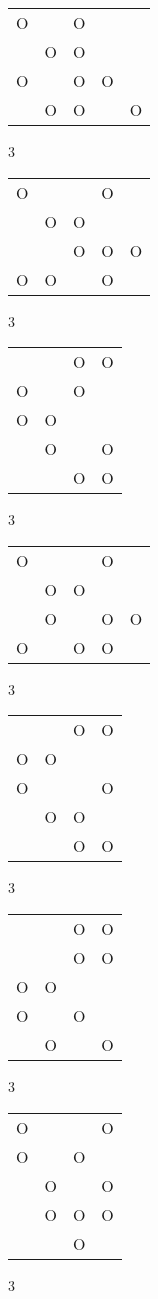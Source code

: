 \begin{tabular}{|m{0.2cm}m{0.2cm}m{0.2cm}m{0.2cm}m{0.2cm}|}\hline
O& &O& & \\
 &O&O& & \\
O& &O&O& \\
 &O&O& &O\\
\hline\end{tabular}3
\begin{tabular}{|m{0.2cm}m{0.2cm}m{0.2cm}m{0.2cm}m{0.2cm}|}\hline
O& & &O& \\
 &O&O& & \\
 & &O&O&O\\
O&O& &O& \\
\hline\end{tabular}3
\begin{tabular}{|m{0.2cm}m{0.2cm}m{0.2cm}m{0.2cm}|}\hline
 & &O&O\\
O& &O& \\
O&O& & \\
 &O& &O\\
 & &O&O\\
\hline\end{tabular}3
\begin{tabular}{|m{0.2cm}m{0.2cm}m{0.2cm}m{0.2cm}m{0.2cm}|}\hline
O& & &O& \\
 &O&O& & \\
 &O& &O&O\\
O& &O&O& \\
\hline\end{tabular}3
\begin{tabular}{|m{0.2cm}m{0.2cm}m{0.2cm}m{0.2cm}|}\hline
 & &O&O\\
O&O& & \\
O& & &O\\
 &O&O& \\
 & &O&O\\
\hline\end{tabular}3
\begin{tabular}{|m{0.2cm}m{0.2cm}m{0.2cm}m{0.2cm}|}\hline
 & &O&O\\
 & &O&O\\
O&O& & \\
O& &O& \\
 &O& &O\\
\hline\end{tabular}3
\begin{tabular}{|m{0.2cm}m{0.2cm}m{0.2cm}m{0.2cm}|}\hline
O& & &O\\
O& &O& \\
 &O& &O\\
 &O&O&O\\
 & &O& \\
\hline\end{tabular}3
